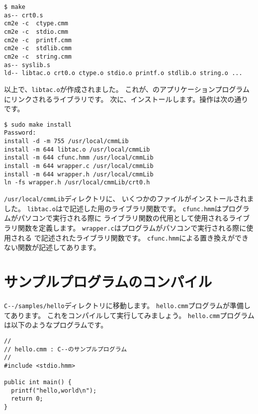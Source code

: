\begin{mylist}
\begin{verbatim}
$ make
as-- crt0.s
cm2e -c  ctype.cmm
cm2e -c  stdio.cmm
cm2e -c  printf.cmm
cm2e -c  stdlib.cmm
cm2e -c  string.cmm
as-- syslib.s
ld-- libtac.o crt0.o ctype.o stdio.o printf.o stdlib.o string.o ...
\end{verbatim}
\end{mylist}

以上で、\verb;libtac.o;が作成されました。
これが、{\tacos}のアプリケーションプログラムにリンクされるライブラリです。
次に、インストールします。操作は次の通りです。

\begin{mylist}
\begin{verbatim}
$ sudo make install
Password:
install -d -m 755 /usr/local/cmmLib
install -m 644 libtac.o /usr/local/cmmLib
install -m 644 cfunc.hmm /usr/local/cmmLib
install -m 644 wrapper.c /usr/local/cmmLib
install -m 644 wrapper.h /usr/local/cmmLib
ln -fs wrapper.h /usr/local/cmmLib/crt0.h
\end{verbatim}
\end{mylist}

\verb;/usr/local/cmmLib;ディレクトリに、
いくつかのファイルがインストールされました。
\verb;libtac.o;は{\cmml}で記述した{\tacos}用のライブラリ関数です。
\verb;cfunc.hmm;は{\cmm}プログラムがパソコンで実行される際に
{\cmml}ライブラリ関数の代用として使用される{\cl}ライブラリ関数を定義します。
\verb;wrapper.c;は{\cmm}プログラムがパソコンで実行される際に使用される
{\cl}で記述された{\cmm}ライブラリ関数です。
\verb;cfunc.hmm;による置き換えができない関数が記述してあります。

\section{サンプルプログラムのコンパイル}

\verb;C--/samples/hello;ディレクトリに移動します。
{\tt hello.cmm}プログラムが準備してあります。
これをコンパイルして実行してみましょう。
{\tt hello.cmm}プログラムは以下のような{\cmml}プログラムです。

\begin{mylist}
\begin{verbatim}
//
// hello.cmm : C--のサンプルプログラム
//
#include <stdio.hmm>

public int main() {
  printf("hello,world\n");
  return 0;
}
\end{verbatim}
\end{mylist}


